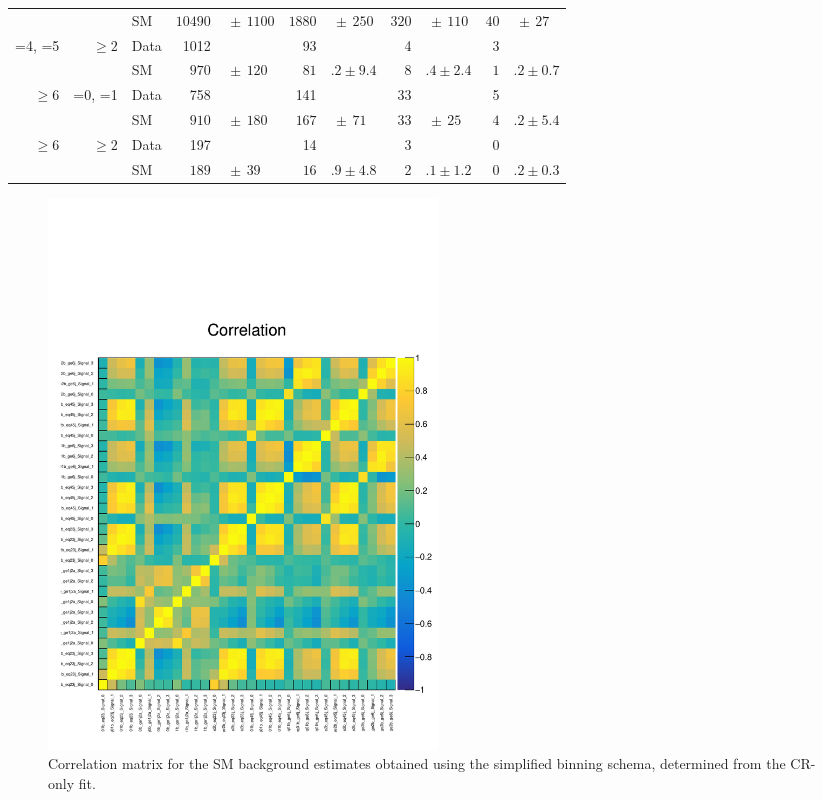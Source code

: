 \begin{table}[!t]
\begin{tabular}{rrlr@{}lr@{}lr@{}lr@{}l}
                   &           & SM   & $10490$  & $\,\pm\, 1100$  & $1880$ & $\,\pm\, 250$ & $320$ & $\,\pm\, 110$ & $40$  & $\,\pm\, 27$ \\[0.2ex]
    =4, =5         & ${\geq}2$ & Data & 1012     &                 & 93     &               & 4     &               & 3                    \\
                   &           & SM   & $970$    & $\,\pm\, 120$   & $81$   & $.2 \pm 9.4$  & $8$   & $.4 \pm 2.4$  & $1$   & $.2 \pm 0.7$ \\[0.2ex]
    ${\geq}6$      & =0, =1    & Data & 758      &                 & 141    &               & 33    &               & 5                    \\
                   &           & SM   & $910$    & $\,\pm\, 180$   & $167$  & $\,\pm\, 71$  & $33$  & $\,\pm\, 25$  & $4$   & $.2 \pm 5.4$ \\[0.2ex]
    ${\geq}6$      & ${\geq}2$ & Data & 197      &                 & 14     &               & 3     &               & 0                    \\
                   &           & SM   & $189$    & $\,\pm\, 39$    & $16$   & $.9 \pm 4.8$  & $2$   & $.1 \pm 1.2$  & $0$   & $.2 \pm 0.3$ \\
    \hline
  \end{tabular}
\end{table}
\endgroup

\begin{figure}[!b]
  \centering
  \includegraphics[width=0.5\textwidth]{Figures/correlation.pdf}
  \caption{Correlation matrix for the SM background estimates obtained
    using the simplified binning schema, determined from the CR-only
    fit.  }
  \label{fig:correlation}
\end{figure} 
